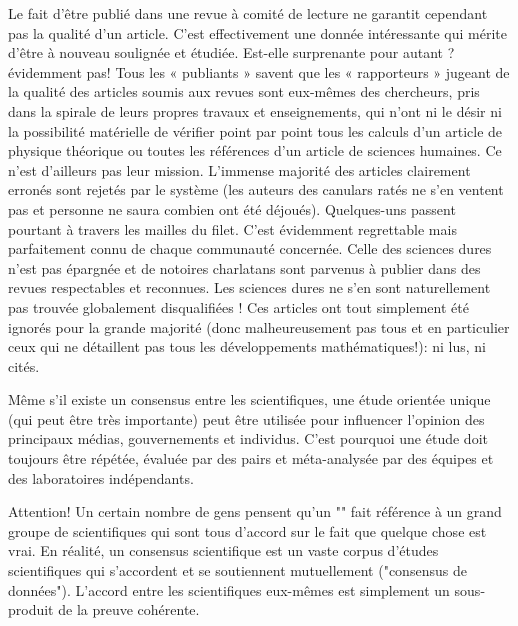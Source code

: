	Le fait d’être publi\'e dans une revue à comit\'e de lecture ne garantit cependant pas la qualit\'e d’un article. C’est effectivement une donn\'ee int\'eressante qui m\'erite d’être à nouveau soulign\'ee et \'etudi\'ee. Est-elle surprenante pour autant ? \'evidemment pas! Tous les « publiants » savent que les « rapporteurs » jugeant de la qualit\'e des articles soumis aux revues sont eux-mêmes des chercheurs, pris dans la spirale de leurs propres travaux et enseignements, qui n’ont ni le d\'esir ni la possibilit\'e mat\'erielle de v\'erifier point par point tous les calculs d’un article de physique th\'eorique ou toutes les r\'ef\'erences d’un article de sciences humaines. Ce n’est d’ailleurs pas leur mission. L’immense majorit\'e des articles clairement erron\'es sont rejet\'es par le système (les auteurs des canulars rat\'es ne s’en ventent pas et personne ne saura combien ont \'et\'e d\'ejou\'es). Quelques-uns passent pourtant à travers les mailles du filet. C’est \'evidemment regrettable mais parfaitement connu de chaque communaut\'e concern\'ee. Celle des sciences dures n’est pas \'epargn\'ee et de notoires charlatans sont parvenus à publier dans des revues respectables et reconnues. Les sciences dures ne s’en sont naturellement pas trouv\'ee globalement disqualifi\'ees ! Ces articles ont tout simplement \'et\'e ignor\'es pour la grande majorit\'e (donc malheureusement pas tous et en particulier ceux qui ne d\'etaillent pas tous les d\'eveloppements math\'ematiques!): ni lus, ni cit\'es.
	
	\begin{tcolorbox}[title=Remarque,colframe=black,arc=10pt]
	Même s'il existe un consensus entre les scientifiques, une \'etude orient\'ee unique (qui peut être très importante) peut être utilis\'ee pour influencer l'opinion des principaux m\'edias, gouvernements et individus. C'est pourquoi une \'etude doit toujours être r\'ep\'et\'ee, \'evalu\'ee par des pairs et m\'eta-analys\'ee par des \'equipes et des laboratoires ind\'ependants.
	\end{tcolorbox}
	
	\begin{tcolorbox}[colback=red!5,borderline={1mm}{2mm}{red!5},arc=0mm,boxrule=0pt]
	\bcbombe Attention! Un certain nombre de gens pensent qu'un "" fait r\'ef\'erence à un grand groupe de scientifiques qui sont tous d'accord sur le fait que quelque chose est vrai. En r\'ealit\'e, un consensus scientifique est un vaste corpus d'\'etudes scientifiques qui s'accordent et se soutiennent mutuellement ("consensus de donn\'ees"). L'accord entre les scientifiques eux-mêmes est simplement un sous-produit de la preuve coh\'erente.
	\end{tcolorbox}
	
